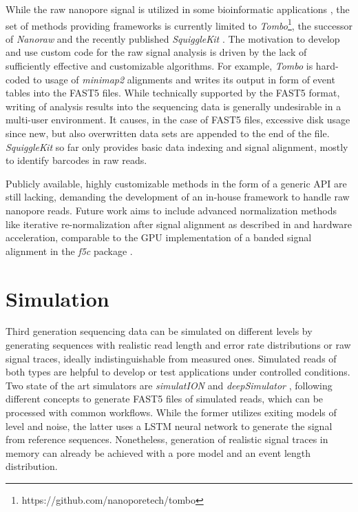 While the raw nanopore signal is utilized in some bioinformatic applications \cite{Simpson2017, Wick2018, Loose2016}, the set of methods providing frameworks is currently limited to \textit{Tombo}\footnote{https://github.com/nanoporetech/tombo}, the successor of \textit{Nanoraw} \cite{Stoiber2017} and the recently published \textit{SquiggleKit} \cite{Ferguson2019}. 
The motivation to develop and use custom code for the raw signal analysis is driven by the lack of sufficiently effective and customizable algorithms. 
For example, \textit{Tombo} is hard-coded to usage of \textit{minimap2} alignments and writes its output in form of event tables into the FAST5 files. While technically supported by the FAST5 format, writing of analysis results into the sequencing data is generally undesirable in a multi-user environment. It causes, in the case of FAST5 files, excessive disk usage since new, but also overwritten data sets are appended to the end of the file. \textit{SquiggleKit} so far only provides basic data indexing and signal alignment, mostly to identify barcodes in raw reads.

Publicly available, highly customizable methods in the form of a generic API are still lacking, demanding the development of an in-house framework to handle raw nanopore reads. Future work aims to include advanced normalization methods like iterative re-normalization after signal alignment as described in \cite{Boza2017} and hardware acceleration, comparable to the GPU implementation of a banded signal alignment in the \textit{f5c} package \cite{Gamaarachchi2020}.




\section{Simulation}
\label{sec:signal:simulation}

Third generation sequencing data can be simulated on different levels by generating sequences with realistic read length and error rate distributions or raw signal traces, ideally indistinguishable from measured ones. Simulated reads of both types are helpful to develop or test applications under controlled conditions. Two state of the art simulators are \textit{simulatION} \cite{Rohrandt2018} and \textit{deepSimulator} \cite{Li2020}, following different concepts to generate FAST5 files of simulated reads, which can be processed with common workflows. While the former utilizes exiting models of level and noise, the latter uses a LSTM neural network to generate the signal from reference sequences. Nonetheless, generation of realistic signal traces in memory can already be achieved with a pore model and an event length distribution.

